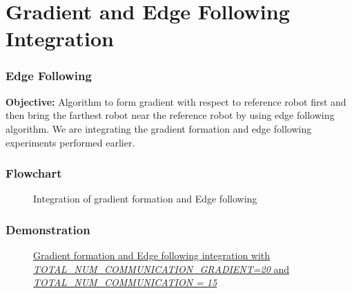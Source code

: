 \section{Gradient and Edge Following Integration}
\begin{frame}
	\frametitle{Edge Following}
		\textbf{Objective:} Algorithm to form  gradient  with  respect  to  reference  robot  first  and then bring the farthest robot near the reference robot by using edge following algorithm.  We are integrating the gradient formation and edge following experiments performed earlier.
\end{frame}

\begin{frame}
\frametitle{Flowchart}
\begin{figure}[H]
	\centering
	\caption{Integration of gradient formation and Edge following}
	\label{fig:Flowchart for integration of gradient formation and Edge following}
\end{figure}
\end{frame}

\begin{frame}
\frametitle{Demonstration}
\begin{figure}[H]
	\centering
	\caption{\href{https://drive.google.com/file/d/1hssXnUnJvkTeVwVcXkR3x3gSFJD0FXtD/view}{Gradient formation and Edge following integration with \textit{TOTAL\_NUM\_COMMUNICATION\_GRADIENT=20} and \textit{TOTAL\_NUM\_COMMUNICATION = 15}}}
	\label{fig:Gradient formation and Edge following integration}
\end{figure}
\end{frame}


